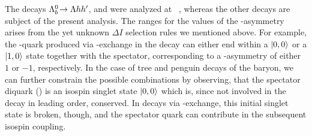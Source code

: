 The decays ${{\Lambda}^0_{b}}\!\rightarrow {\ensuremath{\Lambda}}hh'$, \decay{\Lb}{\Lz\Pphi} and \decay{\Lb}{\jpsi\Lz} were analyzed at \lhcb~\cite{LbToLzhh,LbToLzphi,LbToJpsiLz}, whereas the other decays are subject of the present analysis.
The ranges for the values of the \Lz-\Sz asymmetry arises from the yet unknown $\Delta I$ selection rules we mentioned above.
For example, the \uquark-quark produced via \W-exchange in the \decay{\Lb}{\Lz\Pphi} decay can either end within a $|0, 0\rangle$ or a $|1, 0\rangle$ state together with the spectator, corresponding to a \Lz-\Sz asymmetry of either $1$ or $-1$, respectively.
In the case of tree and penguin decays of the \Lb baryon, we can further constrain the possible combinations by observing, that the spectator diquark (\uquark \dquark) is an isospin singlet state $|0, 0\rangle$ which is, since not involved in the decay in leading order, conserved.
In decays via \W-exchange, this initial singlet state is broken, though, and the spectator quark can contribute in the subsequent isospin coupling.
